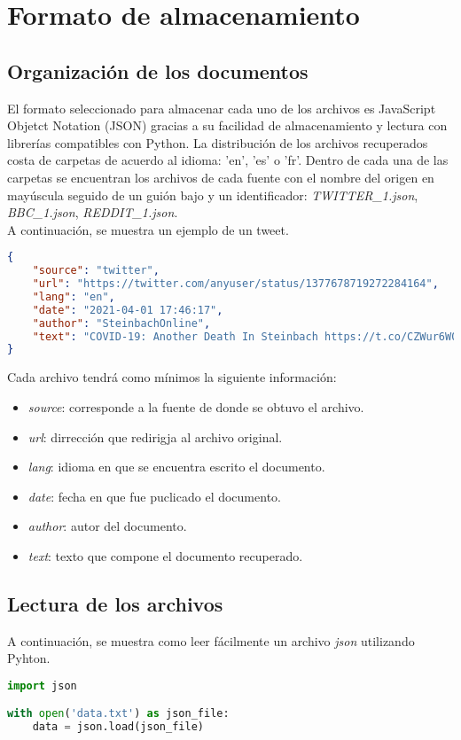 \section{Formato de almacenamiento}

\subsection{Organización de los documentos}
El formato seleccionado para almacenar cada uno de los archivos es JavaScript Objetct Notation (JSON) gracias a su facilidad de almacenamiento y lectura con librerías compatibles con Python. La distribución de los archivos recuperados costa de carpetas de acuerdo al idioma: 'en', 'es' o 'fr'. Dentro de cada una de las carpetas se encuentran los archivos de cada fuente con el nombre del origen en mayúscula seguido de un guión bajo y un identificador: \textit{TWITTER\_1.json}, \textit{BBC\_1.json}, \textit{REDDIT\_1.json}.\\

A continuación, se muestra un ejemplo de un tweet.

\begin{lstlisting}[language=json,firstnumber=1]
{
    "source": "twitter",
    "url": "https://twitter.com/anyuser/status/1377678719272284164",
    "lang": "en",
    "date": "2021-04-01 17:46:17",
    "author": "SteinbachOnline",
    "text": "COVID-19: Another Death In Steinbach https://t.co/CZWur6W0Mo"
}
\end{lstlisting}

Cada archivo tendrá como mínimos la siguiente información:
\begin{itemize}
    \item \textit{source}: corresponde a la fuente de donde se obtuvo el archivo.
    \item \textit{url}: dirrección que redirigja al archivo original.
    \item \textit{lang}: idioma en que se encuentra escrito el documento.
    \item \textit{date}: fecha en que fue puclicado el documento.
    \item \textit{author}: autor del documento.
    \item \textit{text}: texto que compone el documento recuperado.
\end{itemize}

\subsection{Lectura de los archivos}
A continuación, se muestra como leer fácilmente un archivo \textit{json} utilizando Pyhton.

\begin{lstlisting}[language=Python,firstnumber=1]
import json

with open('data.txt') as json_file:
    data = json.load(json_file)
\end{lstlisting}